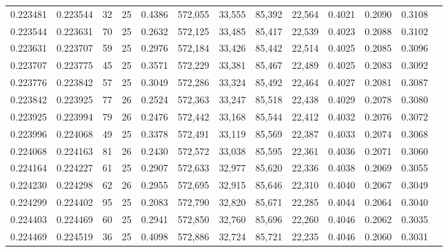 \begin{tabular}{rrrrrrrrrrrrr}
0.223481 & 0.223544 &    32 &  25 &                                     0.4386 & 572,055 &  33,555 &  85,392 &  22,564 & 0.4021 & 0.2090 & 0.3108 \\
0.223544 & 0.223631 &    70 &  25 &                                     0.2632 & 572,125 &  33,485 &  85,417 &  22,539 & 0.4023 & 0.2088 & 0.3102 \\
0.223631 & 0.223707 &    59 &  25 &                                     0.2976 & 572,184 &  33,426 &  85,442 &  22,514 & 0.4025 & 0.2085 & 0.3096 \\
0.223707 & 0.223775 &    45 &  25 &                                     0.3571 & 572,229 &  33,381 &  85,467 &  22,489 & 0.4025 & 0.2083 & 0.3092 \\
0.223776 & 0.223842 &    57 &  25 &                                     0.3049 & 572,286 &  33,324 &  85,492 &  22,464 & 0.4027 & 0.2081 & 0.3087 \\
0.223842 & 0.223925 &    77 &  26 &                                     0.2524 & 572,363 &  33,247 &  85,518 &  22,438 & 0.4029 & 0.2078 & 0.3080 \\
0.223925 & 0.223994 &    79 &  26 &                                     0.2476 & 572,442 &  33,168 &  85,544 &  22,412 & 0.4032 & 0.2076 & 0.3072 \\
0.223996 & 0.224068 &    49 &  25 &                                     0.3378 & 572,491 &  33,119 &  85,569 &  22,387 & 0.4033 & 0.2074 & 0.3068 \\
0.224068 & 0.224163 &    81 &  26 &                                     0.2430 & 572,572 &  33,038 &  85,595 &  22,361 & 0.4036 & 0.2071 & 0.3060 \\
0.224164 & 0.224227 &    61 &  25 &                                     0.2907 & 572,633 &  32,977 &  85,620 &  22,336 & 0.4038 & 0.2069 & 0.3055 \\
0.224230 & 0.224298 &    62 &  26 &                                     0.2955 & 572,695 &  32,915 &  85,646 &  22,310 & 0.4040 & 0.2067 & 0.3049 \\
0.224299 & 0.224402 &    95 &  25 &                                     0.2083 & 572,790 &  32,820 &  85,671 &  22,285 & 0.4044 & 0.2064 & 0.3040 \\
0.224403 & 0.224469 &    60 &  25 &                                     0.2941 & 572,850 &  32,760 &  85,696 &  22,260 & 0.4046 & 0.2062 & 0.3035 \\
0.224469 & 0.224519 &    36 &  25 &                                     0.4098 & 572,886 &  32,724 &  85,721 &  22,235 & 0.4046 & 0.2060 & 0.3031 \\

\end{tabular}
